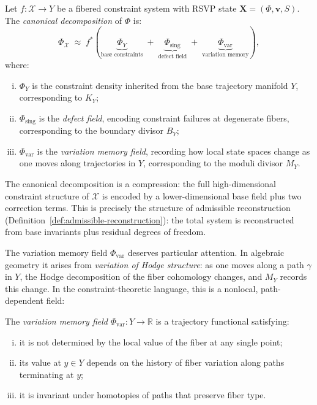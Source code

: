 \documentclass[11pt,openany]{book}
\begin{document}
\begin{definition}
\label{def:canonical-decomposition}
Let $f : \mathcal{X} \to Y$ be a fibered constraint system
with RSVP state $\mathbf{X} = (\Phi, \boldsymbol{v}, S)$.
The \emph{canonical decomposition} of $\Phi$ is:
\[
  \Phi_{\mathcal{X}} \;\approx\;
    f^*\!\left(
      \underbrace{\Phi_Y}_{\text{base constraints}} \;+\;
      \underbrace{\Phi_{\mathrm{sing}}}_{\text{defect field}} \;+\;
      \underbrace{\Phi_{\mathrm{var}}}_{\text{variation memory}}
    \right),
\]
where:
\begin{enumerate}[(i)]
  \item $\Phi_Y$ is the constraint density inherited from
    the base trajectory manifold $Y$, corresponding to
    $K_Y$;
  \item $\Phi_{\mathrm{sing}}$ is the \emph{defect field},
    encoding constraint failures at degenerate fibers,
    corresponding to the boundary divisor $B_Y$;
  \item $\Phi_{\mathrm{var}}$ is the \emph{variation memory
    field}, recording how local state spaces change as one
    moves along trajectories in $Y$, corresponding to the
    moduli divisor $M_Y$.
\end{enumerate}
\end{definition}

\begin{remark}
The canonical decomposition is a compression: the full
high-dimensional constraint structure of $\mathcal{X}$ is
encoded by a lower-dimensional base field plus two
correction terms.  This is precisely the structure of
admissible reconstruction (Definition~\ref{def:admissible-reconstruction}):
the total system is reconstructed from base invariants
plus residual degrees of freedom.
\end{remark}

The variation memory field $\Phi_{\mathrm{var}}$ deserves
particular attention.  In algebraic geometry it arises
from \emph{variation of Hodge structure}: as one moves
along a path $\gamma$ in $Y$, the Hodge decomposition of
the fiber cohomology changes, and $M_Y$ records this
change.  In the constraint-theoretic language, this is a
nonlocal, path-dependent field:

\begin{definition}
\label{def:variation-memory}
The \emph{variation memory field} $\Phi_{\mathrm{var}} :
Y \to \mathbb{R}$ is a trajectory functional satisfying:
\begin{enumerate}[(i)]
  \item it is not determined by the local value of the
    fiber at any single point;
  \item its value at $y \in Y$ depends on the history of
    fiber variation along paths terminating at $y$;
  \item it is invariant under homotopies of paths that
    preserve fiber type.
\end{enumerate}
\end{definition}
\end{document}
